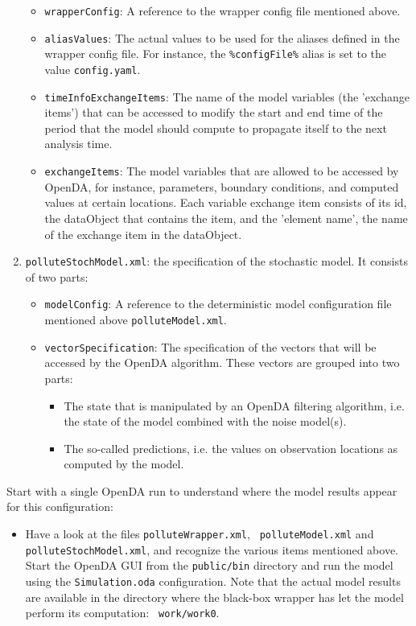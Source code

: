 \begin{enumerate}
\begin{itemize}
        \item {\tt wrapperConfig}: A reference to the wrapper config file
          mentioned above.
        \item {\tt aliasValues}: The actual values to be used for the aliases
          defined in the wrapper config file. For instance, the \verb|%configFile%|
          alias is set to the value \verb|config.yaml|.
        \item {\tt timeInfoExchangeItems}: The name of the model variables (the
          'exchange items') that can be accessed to modify the start and end
          time of the period that the model should compute to propagate
          itself to the next analysis time.
        \item {\tt exchangeItems}: The model variables that are allowed to be
          accessed by OpenDA, for instance, parameters, boundary conditions, and
          computed values at certain locations. Each variable exchange item
          consists of its id, the dataObject that contains the item, and the
          'element name', the name of the exchange item in the dataObject.
     \end{itemize}
   \item {\tt polluteStochModel.xml}: the specification of the
     stochastic model. It consists of two parts:
     \begin{itemize}
        \item {\tt modelConfig}: A reference to the deterministic model
          configuration file mentioned above {\tt polluteModel.xml}.
        \item {\tt vectorSpecification}: The specification of the vectors that
          will be accessed by the OpenDA algorithm. These vectors are grouped
          into two parts:
          \begin{itemize}
             \item The state that is manipulated by an OpenDA filtering
               algorithm, i.e. the state of the model combined with the noise
               model(s).
             \item The so-called predictions, i.e. the values on observation
               locations as computed by the model.
          \end{itemize}
     \end{itemize}
\end{enumerate}

Start with a single OpenDA run to understand where the model results appear
for this configuration:
\begin{itemize}
 \item Have a look at the files {\tt polluteWrapper.xml}, {\tt
   polluteModel.xml} and {\tt polluteStochModel.xml}, and recognize the various
   items mentioned a\-bove. Start the OpenDA GUI from the {\tt public/bin}
   directory and run the model using the {\tt Simulation.oda} configuration.
   Note that the actual model results are available in the directory where the
   black-box wrapper has let the model perform its computation: {\tt
     work/work0}.
\end{itemize}
